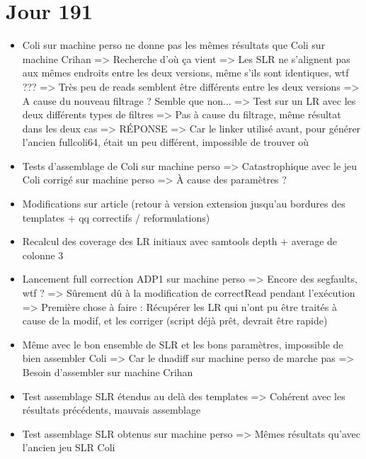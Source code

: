 \documentclass[12pt]{report}
\begin{document}
\section{Jour 191}

\begin{itemize}
	\item Coli sur machine perso ne donne pas les mêmes résultats que Coli sur machine Crihan => Recherche d'où ça vient
		  => Les SLR ne s'alignent pas aux mêmes endroits entre les deux versions, même s'ils sont identiques, wtf ???
		  => Très peu de reads semblent être différents entre les deux versions
		  => A cause du nouveau filtrage ? Semble que non...
		  => Test sur un LR avec les deux différents types de filtres => Pas à cause du filtrage, même résultat dans les deux cas
		  => RÉPONSE => Car le linker utilisé avant, pour générer l'ancien fullcoli64, était un peu différent, impossible de trouver où
		  
	\item Tests d'assemblage de Coli sur machine perso => Catastrophique avec le jeu Coli corrigé sur machine perso
			=> À cause des paramètres ?
	
	\item Modifications sur article (retour à version extension jusqu'au bordures des templates + qq correctifs / reformulations)
		  
	\item Recalcul des coverage des LR initiaux avec samtools depth + average de colonne 3
	
	\item Lancement full correction ADP1 sur machine perso
		  => Encore des segfaults, wtf ? => Sûrement dû à la modification de correctRead pendant l'exécution
		  => Première chose à faire : Récupérer les LR qui n'ont pu être traités à cause de la modif, et les corriger
		  	 (script déjà prêt, devrait être rapide)
	
	\item Même avec le bon ensemble de SLR et les bons paramètres, impossible de bien assembler Coli 
		=> Car le dnadiff sur machine perso de marche pas
		=> Besoin d'assembler sur machine Crihan
	
	\item Test assemblage SLR étendus au delà des templates => Cohérent avec les résultats précédents, mauvais assemblage
	
	\item Test assemblage SLR obtenus sur machine perso => Mêmes résultats qu'avec l'ancien jeu SLR Coli
\end{itemize}
\end{document}
